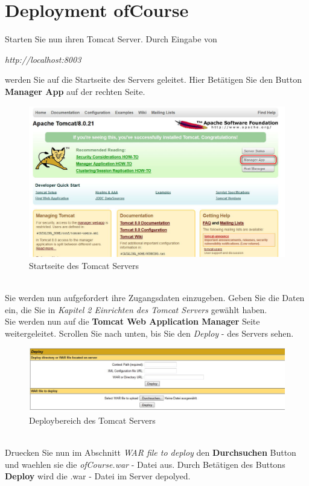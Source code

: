\documentclass[a4paper, 12pt]{scrreprt}
\begin{document}
\chapter{Deployment ofCourse}
Starten Sie nun ihren Tomcat Server. Durch Eingabe von
\begin{center}
		{\it http://localhost:8003}
\end{center}
werden Sie auf die Startseite des Servers geleitet. Hier Betätigen Sie den Button \textbf{Manager App} auf der rechten Seite.
\begin{figure}[h]
\centering
\includegraphics[width=0.8\linewidth]{Grafiken/ServerStartPage}
\caption{Startseite des Tomcat Servers}
\label{fig:ServerStartPage}
\end{figure}\\
Sie werden nun aufgefordert ihre Zugangsdaten einzugeben. Geben Sie die Daten ein, die Sie in {\it Kapitel 2 Einrichten des Tomcat Servers} gewählt haben. 
\newpage 
\ \\
Sie werden nun auf die \textbf{Tomcat Web Application Manager} Seite weitergeleitet.
Scrollen Sie nach unten, bis Sie den {\it Deploy} - des Servers sehen.
\begin{figure}[h]
\centering
\includegraphics[width=0.9\linewidth]{Grafiken/ServerDeploy}
\caption{Deploybereich des Tomcat Servers}
\label{fig:ServerDeploy}
\end{figure}
\\
Druecken Sie nun im Abschnitt {\it WAR file to deploy} den \textbf{Durchsuchen} Button und waehlen sie die {\it ofCourse.war} - Datei aus. Durch Betätigen des Buttons \textbf{Deploy} wird die .war - Datei im Server depolyed.\\
\end{document}
